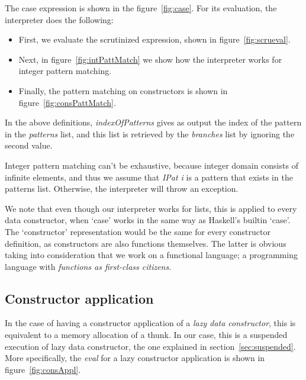 \documentclass[diploma]{softlab-thesis}
\begin{document}
The case expression is shown in the figure~\ref{fig:case}. For its evaluation, the interpreter 
does the following:~
\begin{itemize}
  \item First, we evaluate the scrutinized expression, shown in figure~\ref{fig:scrueval}.
  \item Next, in figure~\ref{fig:intPattMatch} we show how the interpreter works for 
        integer pattern matching.
  \item Finally, the pattern matching on constructors is shown in figure~\ref{fig:consPattMatch}.
\end{itemize}


In the above definitions, \textit{indexOfPatterns} gives as output the index of the pattern 
in the \textit{patterns} list, and this list is retrieved by the \textit{branches} list 
by ignoring the second value.

Integer pattern matching can't be exhaustive, because integer domain consists of infinite elements, and thus we 
assume that \textit{IPat i} is a pattern that exists in the patterns list. Otherwise, the interpreter will throw an exception.


We note that even though our interpreter works for lists, this is applied to every data constructor, 
when `case' works in the same way as Haskell's builtin `case'. The `constructor' representation 
would be the same for every constructor definition, as constructors are also functions themselves. 
The latter is obvious taking into consideration that we work on a functional language; 
a programming language with \textit{functions as first-class citizens}.

\subsection{Constructor application}

In the case of having a constructor application of a \textit{lazy data constructor},
this is equivalent to a memory allocation of a thunk. In our case, this is 
a suspended execution of lazy data constructor, the one explained in section~\ref{sec:suspended}.
More specifically, the \textit{eval} for a lazy constructor application 
is shown in figure~\ref{fig:consAppl}.
\end{document}
